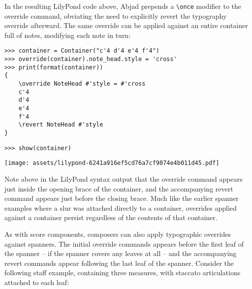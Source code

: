 \noindent In the resulting LilyPond code above, Abjad prepends a
\texttt{\textbackslash{}once} modifier to the override command, obviating the
need to explicitly revert the typography override afterward. The same override
can be applied against an entire container full of notes, modifying each note
in turn:

\begin{comment}
<abjad>
container = Container("c'4 d'4 e'4 f'4")
override(container).note_head.style = 'cross'
print(format(container))
show(container)
</abjad>
\end{comment}

\begin{abjadbookoutput}
\begin{singlespacing}
\vspace{-0.5\baselineskip}
\begin{verbatim}
>>> container = Container("c'4 d'4 e'4 f'4")
>>> override(container).note_head.style = 'cross'
>>> print(format(container))
{
    \override NoteHead #'style = #'cross
    c'4
    d'4
    e'4
    f'4
    \revert NoteHead #'style
}
\end{verbatim}
\begin{verbatim}
>>> show(container)
\end{verbatim}
\noindent\texttt{[image: assets/lilypond-6241a916ef5cd76a7cf9074e4b011d45.pdf]}
\end{singlespacing}
\end{abjadbookoutput}

\noindent Note above in the LilyPond syntax output that the override command
appears just inside the opening brace of the container, and the accompanying
revert command appears just before the closing brace. Much like the earlier
spanner examples where a slur was attached directly to a container, overrides
applied against a container persist regardless of the contents of that
container.

As with score components, composers can also apply typographic overrides
against spanners. The initial override commands appears before the first leaf
of the spanner -- if the spanner covers any leaves at all -- and the
accompanying revert commands appear following the last leaf of the spanner.
Consider the following staff example, containing three measures, with staccato
articulations attached to each leaf:

\begin{comment}
<abjad>
staff = Staff()
staff.append(Measure((3, 4), "c'4 d' r"))
staff.append(Measure((5, 4), r"e'4 \times 2/3 { f' g' r4 } a' b"))
staff.append(Measure((2, 4), "c''8 g' c'4"))
articulation = Articulation('staccato')
for leaf in staff.select_leaves():
    if isinstance(leaf, Note):
        attach(articulation, leaf)

show(staff)
</abjad>
\end{comment}

